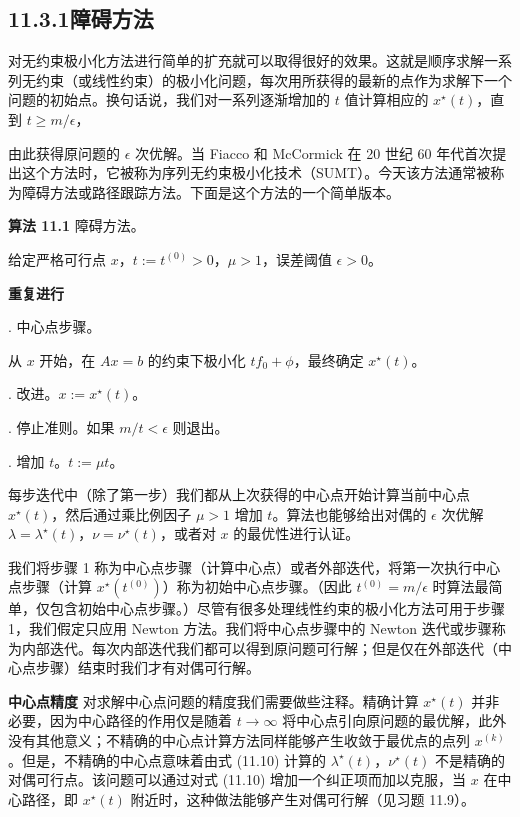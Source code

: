 \documentclass[UTF8, 12pt, fontset=fandol, oneside]{ctexart}
\begin{document}
\subsection*{11.3.1\quad 障碍方法}

对无约束极小化方法进行简单的扩充就可以取得很好的效果。这就是顺序求解一系列无约束（或线性约束）的极小化问题，每次用所获得的最新的点作为求解下一个问题的初始点。换句话说，我们对一系列逐渐增加的 $t$ 值计算相应的 $x^\star(t)$，直到 $t\geq m/\epsilon$，

由此获得原问题的 $\epsilon$ 次优解。当 Fiacco 和 McCormick 在 20 世纪 60 年代首次提出这个方法时，它被称为序列无约束极小化技术（SUMT）。今天该方法通常被称为障碍方法或路径跟踪方法。下面是这个方法的一个简单版本。

\noindent\textbf{算法 11.1}\quad
障碍方法。

给定严格可行点 $x$，$t:=t^{(0)}>0$，$\mu>1$，误差阈值 $\epsilon>0$。

\noindent\textbf{重复进行}

. 中心点步骤。

\noindent\quad 从 $x$ 开始，在 $Ax=b$ 的约束下极小化 $tf_0+\phi$，最终确定 $x^\star(t)$。

. 改进。$x:=x^\star(t)$。

. 停止准则。如果 $m/t<\epsilon$ 则退出。

. 增加 $t$。$t:=\mu t$。

每步迭代中（除了第一步）我们都从上次获得的中心点开始计算当前中心点 $x^\star(t)$，然后通过乘比例因子 $\mu>1$ 增加 $t$。算法也能够给出对偶的 $\epsilon$ 次优解 $\lambda=\lambda^\star(t)$，$\nu=\nu^\star(t)$，或者对 $x$ 的最优性进行认证。

我们将步骤 1 称为中心点步骤（计算中心点）或者外部迭代，将第一次执行中心点步骤（计算 $x^\star(t^{(0)})$）称为初始中心点步骤。（因此 $t^{(0)}=m/\epsilon$ 时算法最简单，仅包含初始中心点步骤。）尽管有很多处理线性约束的极小化方法可用于步骤 1，我们假定只应用 Newton 方法。我们将中心点步骤中的 Newton 迭代或步骤称为内部迭代。每次内部迭代我们都可以得到原问题可行解；但是仅在外部迭代（中心点步骤）结束时我们才有对偶可行解。

\noindent\textbf{中心点精度}\quad
对求解中心点问题的精度我们需要做些注释。精确计算 $x^\star(t)$ 并非必要，因为中心路径的作用仅是随着 $t\to\infty$ 将中心点引向原问题的最优解，此外没有其他意义；不精确的中心点计算方法同样能够产生收敛于最优点的点列 $x^{(k)}$。但是，不精确的中心点意味着由式 (11.10) 计算的 $\lambda^\star(t)$，$\nu^\star(t)$ 不是精确的对偶可行点。该问题可以通过对式 (11.10) 增加一个纠正项而加以克服，当 $x$ 在中心路径，即 $x^\star(t)$ 附近时，这种做法能够产生对偶可行解（见习题 11.9）。
\end{document}

